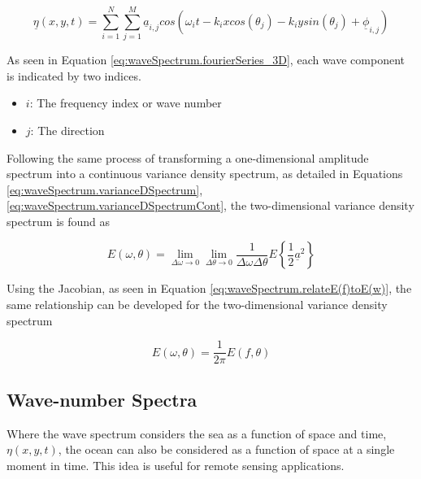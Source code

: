 \begin{equation} \label{eq:waveSpectrum.fourierSeries_3D}
    \underline{\eta}(x,y,t) = \sum_{i=1}^{N} \sum_{j=1}^{M} \underline{a}_{i,j}cos(\omega_{i}t-k_{i}xcos(\theta_{j}) - k_{i}ysin(\theta_{j}) + \underline{\phi}_{i,j})
\end{equation}

As seen in Equation \ref{eq:waveSpectrum.fourierSeries_3D}, each wave component is indicated by two indices.
\begin{itemize}
    \item $i$: The frequency index or wave number
    \item $j$: The direction
\end{itemize}

Following the same process of transforming a one-dimensional amplitude spectrum into a continuous variance density spectrum, as detailed in Equations \ref{eq:waveSpectrum.varianceDSpectrum}, \ref{eq:waveSpectrum.varianceDSpectrumCont}, the two-dimensional variance density spectrum is found as

\begin{equation} \label{eq:waveSpectrum.varianceDSpectrumCont_2D}
    E(\omega,\theta) =  \lim_{\Delta \omega \to 0}\lim_{\Delta \theta \to 0}\frac{1}{\Delta \omega \Delta \theta} E\left \{ \frac{1}{2} \underline{a}^{2}\right \}
\end{equation}

Using the Jacobian, as seen in Equation \ref{eq:waveSpectrum.relateE(f)toE(w)}, the same relationship can be developed for the two-dimensional variance density spectrum

\begin{equation} \label{eq:waveSpectrum.relateE(f)toE(w)_2D}
    E(\omega,\theta) =  \frac{1}{2\pi}E(f,\theta)
\end{equation}

\subsection{Wave-number Spectra} \label{subsec:theory.waves.waveNumberSpectra}
Where the wave spectrum considers the sea as a function of space and time, $\eta(x,y,t)$, the ocean can also be considered as a function of space at a single moment in time. This idea is useful for remote sensing applications.


